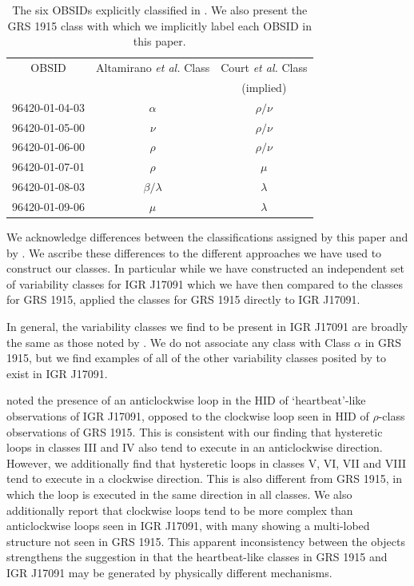 \begin{table}
\centering
\caption{The six OBSIDs explicitly classified in \citet{Altamirano_IGR_FH}.  We also present the GRS 1915 class with which we implicitly label each OBSID in this paper.}
\label{tab:me_Diego}
\begin{tabular}{ccc} %
\hline
\hline
OBSID & Altamirano \textit{et al.} Class & Court \textit{et al.} Class\\
&&(implied)\\
\hline
96420-01-04-03&$\alpha$&$\rho/\nu$\\
96420-01-05-00&$\nu$&$\rho/\nu$\\
96420-01-06-00&$\rho$&$\rho/\nu$\\
96420-01-07-01&$\rho$&$\mu$\\
96420-01-08-03&$\beta/\lambda$&$\lambda$\\
96420-01-09-06&$\mu$&$\lambda$\\
\hline
\hline

\end{tabular}
\end{table}

\par We acknowledge differences between the classifications assigned by this paper and by \citet{Altamirano_IGR_FH}.  We ascribe these differences to the different approaches we have used to construct our classes.  In particular while we have constructed an independent set of variability classes for IGR J17091 which we have then compared to the \citeauthor{Belloni_GRS_MI} classes for GRS 1915, \citeauthor{Altamirano_IGR_FH} applied the \citeauthor{Belloni_GRS_MI} classes for GRS 1915 directly to IGR J17091.
\par In general, the variability classes we find to be present in IGR J17091 are broadly the same as those noted by \citet{Altamirano_IGR_FH}.  We do not associate any class with Class $\alpha$ in GRS 1915, but we find examples of all of the other variability classes posited by \citeauthor{Altamirano_IGR_FH} to exist in IGR J17091.
\par \citealp{Altamirano_IGR_FH} noted the presence of an anticlockwise loop in the HID of `heartbeat'-like observations of IGR J17091, opposed to the clockwise loop seen in HID of $\rho$-class observations of GRS 1915.  This is consistent with our finding that hysteretic loops in classes III and IV also tend to execute in an anticlockwise direction.  However, we additionally find that hysteretic loops in classes V, VI, VII and VIII tend to execute in a clockwise direction.  This is also different from GRS 1915, in which the loop is executed in the same direction in all classes.  We also additionally report that clockwise loops tend to be more complex than anticlockwise loops seen in IGR J17091, with many showing a multi-lobed structure not seen in GRS 1915.  This apparent inconsistency between the objects strengthens the suggestion in \citealp{Altamirano_IGR_FH} that the heartbeat-like classes in GRS 1915 and IGR J17091 may be generated by physically different mechanisms.

